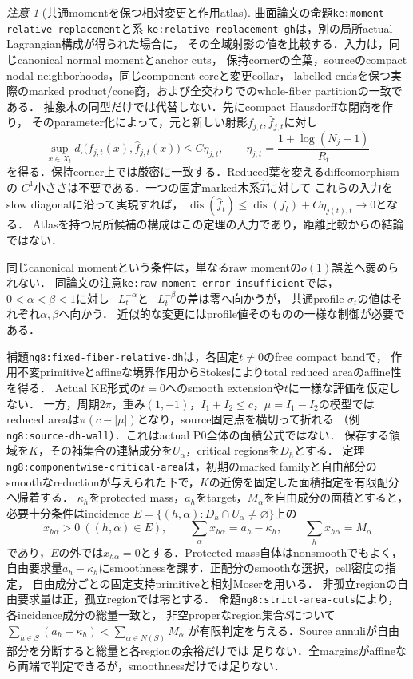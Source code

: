 \documentclass[a4paper,11pt]{ltjsarticle}
\numberwithin{equation}{section}
\theoremstyle{plain}
\theoremstyle{definition}
\theoremstyle{remark}
\newtheorem{remark}[theorem]{注意}
\newcommand{\Lt}{L_t}
\newcommand{\Rt}{R_t}
\begin{document}
\begin{remark}[共通momentを保つ相対変更と作用atlas]
曲面論文の命題\texttt{ke:moment-relative-replacement}と系
\texttt{ke:relative-replacement-gh}は，別の局所actual Lagrangian構成が得られた場合に，
その全域射影の値を比較する．入力は，同じcanonical normal momentとanchor cuts，
保持cornerの全葉，sourceのcompact nodal neighborhoods，同じcomponent coreと変更collar，
labelled endsを保つ実際のmarked product/cone商，および全交わりでのwhole-fiber partitionの一致である．
抽象木の同型だけでは代替しない．先にcompact Hausdorffな閉商を作り，
そのparameter化によって，元と新しい射影\(f_{j,t},\widehat f_{j,t}\)に対し
\[
 \sup_{x\in X_t}d_\square\bigl(f_{j,t}(x),\widehat f_{j,t}(x)\bigr)
 \le C\eta_{j,t},\qquad
 \eta_{j,t}=\frac{1+\log(N_j+1)}{\Rt}
\]
を得る．保持corner上では厳密に一致する．Reduced葉を変えるdiffeomorphismの
\(C^1\)小ささは不要である．一つの固定marked木系\(\widehat T\)に対して
これらの入力をslow diagonalに沿って実現すれば，
\(\operatorname{dis}(\widehat f_t)\le\operatorname{dis}(f_t)+C\eta_{j(t),t}\to0\)となる．
Atlasを持つ局所候補の構成はこの定理の入力であり，距離比較からの結論ではない．

同じcanonical momentという条件は，単なるraw momentの\(o(1)\)誤差へ弱められない．
同論文の注意\texttt{ke:raw-moment-error-insufficient}では，
\(0<\alpha<\beta<1\)に対し\(-\Lt^{-\alpha}\)と\(-\Lt^{-\beta}\)の差は零へ向かうが，
共通profile \(\sigma_t\)の値はそれぞれ\(\alpha,\beta\)へ向かう．
近似的な変更にはprofile値そのものの一様な制御が必要である．

補題\texttt{ng8:fixed-fiber-relative-dh}は，各固定\(t\ne0\)のfree compact bandで，
作用不変primitiveとaffineな境界作用からStokesによりtotal reduced areaのaffine性を得る．
Actual KE形式の\(t=0\)へのsmooth extensionや\(t\)に一様な評価を仮定しない．
一方，周期\(2\pi\)，重み\((1,-1)\)，\(I_1+I_2\le c\)，\(\mu=I_1-I_2\)の模型では
reduced areaは\(\pi(c-|\mu|)\)となり，source固定点を横切って折れる
（例\texttt{ng8:source-dh-wall}）．これはactual P0全体の面積公式ではない．
保存する領域を\(K\)，その補集合の連結成分を\(U_\alpha\)，critical regionsを\(D_h\)とする．
定理\texttt{ng8:componentwise-critical-area}は，初期のmarked familyと自由部分の
smoothなreductionが与えられた下で，\(K\)の近傍を固定した面積指定を有限配分へ帰着する．
\(\kappa_h\)をprotected mass，\(a_h\)をtarget，\(M_\alpha\)を自由成分の面積とすると，
必要十分条件はincidence \(E=\{(h,\alpha):D_h\cap U_\alpha\ne\varnothing\}\)上の
\[
 x_{h\alpha}>0\ ((h,\alpha)\in E),\qquad
 \sum_\alpha x_{h\alpha}=a_h-\kappa_h,\qquad
 \sum_hx_{h\alpha}=M_\alpha
\]
であり，\(E\)の外では\(x_{h\alpha}=0\)とする．Protected mass自体はnonsmoothでもよく，
自由要求量\(a_h-\kappa_h\)にsmoothnessを課す．正配分のsmoothな選択，cell密度の指定，
自由成分ごとの固定支持primitiveと相対Moserを用いる．
非孤立regionの自由要求量は正，孤立regionでは零とする．
命題\texttt{ng8:strict-area-cuts}により，各incidence成分の総量一致と，
非空properなregion集合\(S\)について
\(\sum_{h\in S}(a_h-\kappa_h)<\sum_{\alpha\in N(S)}M_\alpha\)
が有限判定を与える．Source annuliが自由部分を分断すると総量と各regionの余裕だけでは
足りない．全marginsがaffineなら両端で判定できるが，smoothnessだけでは足りない．


\end{remark}
\end{document}
